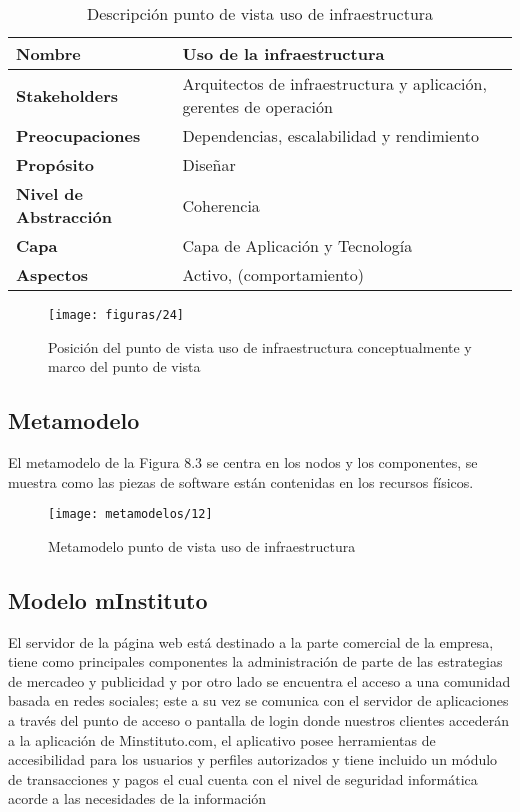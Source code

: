   \begin{table}[H]
  	\centering
  	\begin{tabular}{lp{8cm}}
  		\toprule
  		\textbf{Nombre} & \textbf{Uso de la infraestructura} \\
  		\midrule
  		\textbf{Stakeholders} & Arquitectos de infraestructura y aplicación, gerentes de operación \\
  		\textbf{Preocupaciones} & Dependencias, escalabilidad y rendimiento \\
  		\textbf{Propósito} & Diseñar \\
  		\textbf{Nivel de Abstracción} & Coherencia \\
  		\textbf{Capa} & Capa de Aplicación y Tecnología \\
  		\textbf{Aspectos} & Activo, (comportamiento) \\
  		\bottomrule
  	\end{tabular}
  	\captionsetup{width=.95\textwidth}
  	\caption{Descripción punto de vista uso de infraestructura}
  	\label{tabla15}
  \end{table}
  
  \begin{figure}[H]
  	\centering
  	\texttt{[image: figuras/24]}
  	\captionsetup{width=.95\textwidth}
  	\caption{Posición del punto de vista uso de infraestructura conceptualmente y marco del punto de vista}
  	\label{figura24}
  \end{figure}
  
  \subsection{Metamodelo}
  El metamodelo de la Figura 8.3 se centra en los nodos y los componentes, se muestra como las piezas de software están contenidas en los recursos físicos.
  
  \begin{figure}[H]
  	\centering
  	\texttt{[image: metamodelos/12]}
  	\captionsetup{width=.95\textwidth}
  	\caption{Metamodelo punto de vista uso de infraestructura}
  	\label{metamodelo12}
  \end{figure}
  
  \subsection{Modelo mInstituto}
  El servidor de la página web está destinado a la parte comercial de la empresa, tiene como principales componentes la administración de parte de las estrategias de mercadeo y publicidad y por otro lado se encuentra el acceso a una comunidad basada en redes sociales; este a su vez se comunica con el servidor de aplicaciones a través del punto de acceso o pantalla de login donde nuestros clientes accederán a la aplicación de Minstituto.com, el aplicativo posee herramientas de accesibilidad para los usuarios y perfiles autorizados y tiene incluido un módulo de transacciones y pagos el cual cuenta con el nivel de seguridad informática acorde a las necesidades de la información
  
